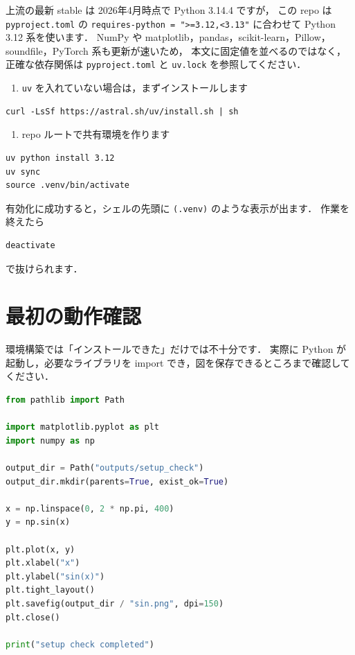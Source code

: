 上流の最新 stable は 2026年4月時点で Python 3.14.4 ですが，
この repo は \texttt{pyproject.toml} の
\texttt{requires-python = ">=3.12,<3.13"} に合わせて Python 3.12 系を使います．
NumPy や matplotlib，pandas，scikit-learn，Pillow，soundfile，PyTorch 系も更新が速いため，
本文に固定値を並べるのではなく，正確な依存関係は \texttt{pyproject.toml} と \texttt{uv.lock} を参照してください．

\begin{enumerate}
\item \texttt{uv} を入れていない場合は，まずインストールします
\end{enumerate}

\begin{lstlisting}[style=codecell]
curl -LsSf https://astral.sh/uv/install.sh | sh
\end{lstlisting}

\begin{enumerate}
\item repo ルートで共有環境を作ります
\end{enumerate}

\begin{lstlisting}[style=codecell]
uv python install 3.12
uv sync
source .venv/bin/activate
\end{lstlisting}

有効化に成功すると，シェルの先頭に \texttt{(.venv)} のような表示が出ます．
作業を終えたら

\begin{lstlisting}[style=codecell]
deactivate
\end{lstlisting}

で抜けられます．


\section{最初の動作確認}

環境構築では「インストールできた」だけでは不十分です．
実際に Python が起動し，必要なライブラリを import でき，図を保存できるところまで確認してください．

\begin{lstlisting}[style=codecell,language=Python]
from pathlib import Path

import matplotlib.pyplot as plt
import numpy as np

output_dir = Path("outputs/setup_check")
output_dir.mkdir(parents=True, exist_ok=True)

x = np.linspace(0, 2 * np.pi, 400)
y = np.sin(x)

plt.plot(x, y)
plt.xlabel("x")
plt.ylabel("sin(x)")
plt.tight_layout()
plt.savefig(output_dir / "sin.png", dpi=150)
plt.close()

print("setup check completed")
\end{lstlisting}

